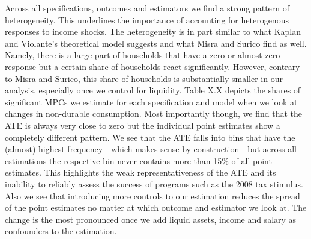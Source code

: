 Across all specifications, outcomes and estimators we find a strong pattern of heterogeneity. This underlines the importance of accounting for heterogenous responses to income shocks. The heterogeneity is in part similar to what Kaplan and Violante's theoretical model suggests and what Misra and Surico find as well. Namely, there is a large part of households that have a zero or almost zero response but a certain share of households react significantly. However, contrary to Misra and Surico, this share of households is substantially smaller in our analysis, especially once we control for liquidity. Table X.X depicts the shares of significant MPCs we estimate for each specification and model when we look at changes in non-durable consumption. Most importantly though, we find that the ATE is always very close to zero but the individual point estimates show a completely different pattern. We see that the ATE falls into bins that have the (almost) highest frequency - which makes sense by construction - but across all estimations the respective bin never contains more than 15\% of all point estimates. This highlights the weak representativeness of the ATE and its inability to reliably assess the success of programs such as the 2008 tax stimulus. \\
Also we see that introducing more controls to our estimation reduces the spread of the point estimates no matter at which outcome and estimator we look at. The change is the most pronounced once we add liquid assets, income and salary as confounders to the estimation. \\
